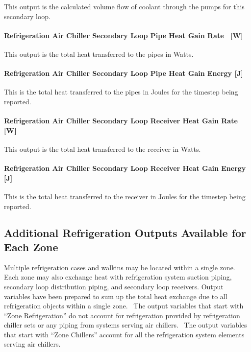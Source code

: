 This output is the calculated volume flow of coolant through the pumps for this secondary loop.

\paragraph{Refrigeration Air Chiller Secondary Loop Pipe Heat Gain Rate~ {[}W{]}}\label{refrigeration-air-chiller-secondary-loop-pipe-heat-gain-rate-w}

This output is the total heat transferred to the pipes in Watts.

\paragraph{Refrigeration Air Chiller Secondary Loop Pipe Heat Gain Energy {[}J{]}}\label{refrigeration-air-chiller-secondary-loop-pipe-heat-gain-energy-j}

This is the total heat transferred to the pipes in Joules for the timestep being reported.

\paragraph{Refrigeration Air Chiller Secondary Loop Receiver Heat Gain Rate~ {[}W{]}}\label{refrigeration-air-chiller-secondary-loop-receiver-heat-gain-rate-w}

This output is the total heat transferred to the receiver in Watts.

\paragraph{Refrigeration Air Chiller Secondary Loop Receiver Heat Gain Energy {[}J{]}}\label{refrigeration-air-chiller-secondary-loop-receiver-heat-gain-energy-j}

This is the total heat transferred to the receiver in Joules for the timestep being reported.

\subsection{Additional Refrigeration Outputs Available for Each Zone}\label{additional-refrigeration-outputs-available-for-each-zone}

Multiple refrigeration cases and walkins may be located within a single zone.~ Each zone may also exchange heat with refrigeration system suction piping, secondary loop distribution piping, and secondary loop receivers. Output variables have been prepared to sum up the total heat exchange due to all refrigeration objects within a single zone.~ The output variables that start with ``Zone Refrigeration'' do not account for refrigeration provided by refrigeration chiller sets or any piping from systems serving air chillers.~ The output variables that start with ``Zone Chillers'' account for all the refrigeration system elements serving air chillers.

